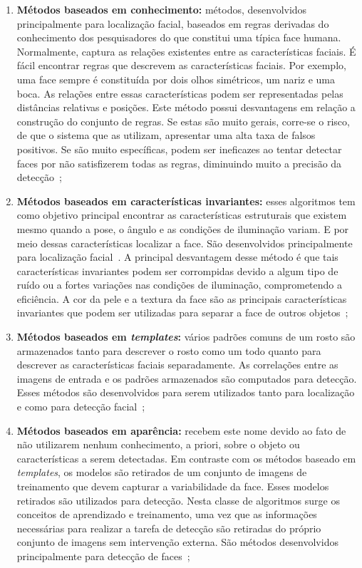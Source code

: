 	\begin{enumerate}
		\item \textbf{Métodos baseados em conhecimento:} métodos, desenvolvidos principalmente para localização facial, baseados em regras derivadas do conhecimento dos pesquisadores do que constitui uma típica face humana. Normalmente, captura as relações existentes entre as características faciais. É fácil encontrar regras que descrevem as características faciais. Por exemplo, uma face sempre é constituída por dois olhos simétricos, um nariz e uma boca. As relações entre essas características podem ser representadas pelas distâncias relativas e posições. Este método possui desvantagens em relação a construção do conjunto de regras. Se estas são muito gerais, corre-se o risco, de que o sistema que as utilizam, apresentar uma alta taxa de falsos positivos. Se são muito específicas, podem ser ineficazes ao tentar detectar faces por não satisfizerem todas as regras, diminuindo muito a precisão da detecção~\cite{yang,lopes};

		\item \textbf{Métodos baseados em características invariantes:} esses algoritmos tem como objetivo principal encontrar as características estruturais que existem mesmo quando a pose, o ângulo e as condições de iluminação variam. E por meio dessas características localizar a face. São desenvolvidos principalmente para localização facial~\cite{yang}. A principal desvantagem desse método é que tais características invariantes podem ser corrompidas devido a algum tipo de ruído ou a fortes variações nas condições de iluminação, comprometendo a eficiência. A cor da pele e a textura da face são as principais características invariantes que podem ser utilizadas para separar a face de outros objetos~\cite{lopes};

		\item \textbf{Métodos baseados em \textit{templates}:} vários padrões comuns de um rosto são armazenados tanto para descrever o rosto como um todo quanto para descrever as características faciais separadamente. As correlações entre as imagens de entrada e os padrões armazenados são computados para detecção. Esses métodos são desenvolvidos para serem utilizados tanto para localização e como para detecção facial~\cite{yang};

		\item \textbf{Métodos baseados em aparência:} recebem este nome devido ao fato de não utilizarem nenhum conhecimento, a priori, sobre o objeto ou características a serem detectadas. Em contraste com os métodos baseado em \textit{templates}, os modelos são retirados de um conjunto de imagens de treinamento que devem capturar a variabilidade da face. Esses modelos retirados são utilizados para detecção. Nesta classe de algoritmos surge os conceitos de aprendizado e treinamento, uma vez que as informações necessárias para realizar a tarefa de detecção são retiradas do próprio conjunto de imagens sem intervenção externa. São métodos desenvolvidos principalmente para detecção de faces~\cite{yang, lopes};

	\end{enumerate}

